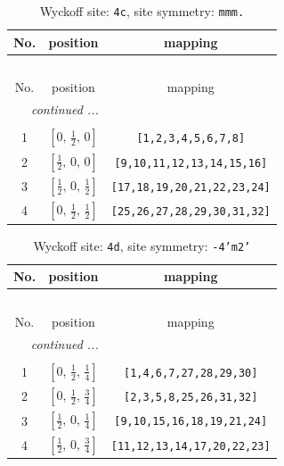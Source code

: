 \documentclass[fleqn,8pt]{jsarticle}
\begin{document}
\renewcommand{\arraystretch}{1.2}
\begin{longtable}{ccc}
\caption{Wyckoff site: {\tt 4c}, site symmetry: {\tt mmm.}}
 \\
 \hline \hline
No. & position & mapping \\ \hline \endfirsthead

\multicolumn{2}{l}{\tablename\ \thetable{}} \\
 \hline \hline
No. & position & mapping \\ \hline \endhead

 \hline \hline
\multicolumn{2}{r}{\footnotesize\it continued ...} \\ \endfoot

 \hline \hline
\multicolumn{2}{r}{} \\ \endlastfoot

1 & $\left[ 0,\, \frac{1}{2},\, 0 \right]$ & {\tt [1,2,3,4,5,6,7,8]} \\ \hline
2 & $\left[ \frac{1}{2},\, 0,\, 0 \right]$ & {\tt [9,10,11,12,13,14,15,16]} \\ \hline
3 & $\left[ \frac{1}{2},\, 0,\, \frac{1}{2} \right]$ & {\tt [17,18,19,20,21,22,23,24]} \\ \hline
4 & $\left[ 0,\, \frac{1}{2},\, \frac{1}{2} \right]$ & {\tt [25,26,27,28,29,30,31,32]} \\
\end{longtable}
\renewcommand{\arraystretch}{1.2}
\begin{longtable}{ccc}
\caption{Wyckoff site: {\tt 4d}, site symmetry: {\tt -4'm2'}}
 \\
 \hline \hline
No. & position & mapping \\ \hline \endfirsthead

\multicolumn{2}{l}{\tablename\ \thetable{}} \\
 \hline \hline
No. & position & mapping \\ \hline \endhead

 \hline \hline
\multicolumn{2}{r}{\footnotesize\it continued ...} \\ \endfoot

 \hline \hline
\multicolumn{2}{r}{} \\ \endlastfoot

1 & $\left[ 0,\, \frac{1}{2},\, \frac{1}{4} \right]$ & {\tt [1,4,6,7,27,28,29,30]} \\ \hline
2 & $\left[ 0,\, \frac{1}{2},\, \frac{3}{4} \right]$ & {\tt [2,3,5,8,25,26,31,32]} \\ \hline
3 & $\left[ \frac{1}{2},\, 0,\, \frac{1}{4} \right]$ & {\tt [9,10,15,16,18,19,21,24]} \\ \hline
4 & $\left[ \frac{1}{2},\, 0,\, \frac{3}{4} \right]$ & {\tt [11,12,13,14,17,20,22,23]} \\
\end{longtable}
\end{document}
